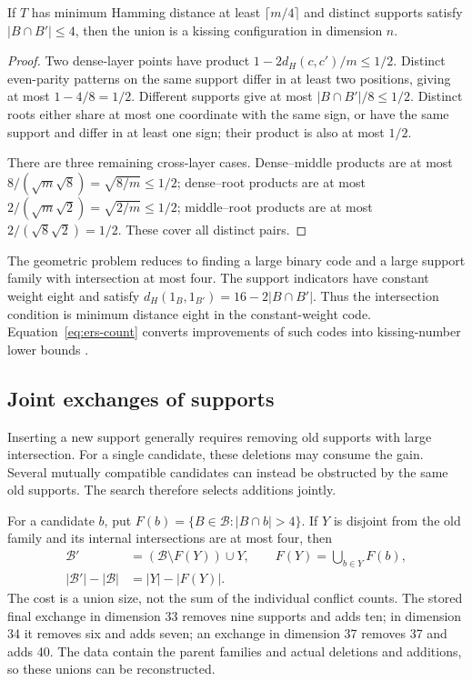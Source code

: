 \begin{proposition}
\label{prop:ers}
If $T$ has minimum Hamming distance at least $\lceil m/4\rceil$ and distinct
supports satisfy $|B\cap B'|\le4$, then the union is a kissing configuration
in dimension $n$.
\end{proposition}
\begin{proof}
Two dense-layer points have product $1-2d_H(c,c')/m\le1/2$.
Distinct even-parity patterns on the same support differ in at least two
positions, giving at most $1-4/8=1/2$. Different supports give at most
$|B\cap B'|/8\le1/2$. Distinct roots either share at most one coordinate
with the same sign, or have the same support and differ in at least one
sign; their product is also at most $1/2$.

There are three remaining cross-layer cases. Dense--middle products are
at most $8/(\sqrt m\sqrt8)=\sqrt{8/m}\le1/2$; dense--root products are
at most $2/(\sqrt m\sqrt2)=\sqrt{2/m}\le1/2$; middle--root products are
at most $2/(\sqrt8\sqrt2)=1/2$. These cover all distinct pairs.
\end{proof}

The geometric problem reduces to finding a large binary code and a large
support family with intersection at most four. The support indicators have
constant weight eight and satisfy
$d_H(1_B,1_{B'})=16-2|B\cap B'|$. Thus the intersection condition is
minimum distance eight in the constant-weight code. Equation~\eqref{eq:ers-count}
converts improvements of such codes into kissing-number lower bounds
\cite{bsss,brouwer,echols}.

\subsection{Joint exchanges of supports}

Inserting a new support generally requires removing old supports with large
intersection. For a single candidate, these deletions may consume the gain.
Several mutually compatible candidates can instead be obstructed by the
same old supports. The search therefore selects additions jointly.

For a candidate $b$, put $F(b)=\{B\in\mathcal B:|B\cap b|>4\}$.
If $Y$ is disjoint from the old family and its internal intersections are
at most four, then
\begin{equation}
\begin{split}
\mathcal B'&=(\mathcal B\setminus F(Y))\cup Y,\qquad
 F(Y)=\bigcup_{b\in Y}F(b),\\
|\mathcal B'|-|\mathcal B|&=|Y|-|F(Y)|.
\end{split}
\label{eq:exchange}
\end{equation}
The cost is a union size, not the sum of the individual conflict counts.
The stored final exchange in dimension 33 removes nine supports and adds
ten; in dimension 34 it removes six and adds seven; an exchange in dimension
37 removes 37 and adds 40. The data contain
the parent families and actual deletions and additions, so these unions
can be reconstructed.

